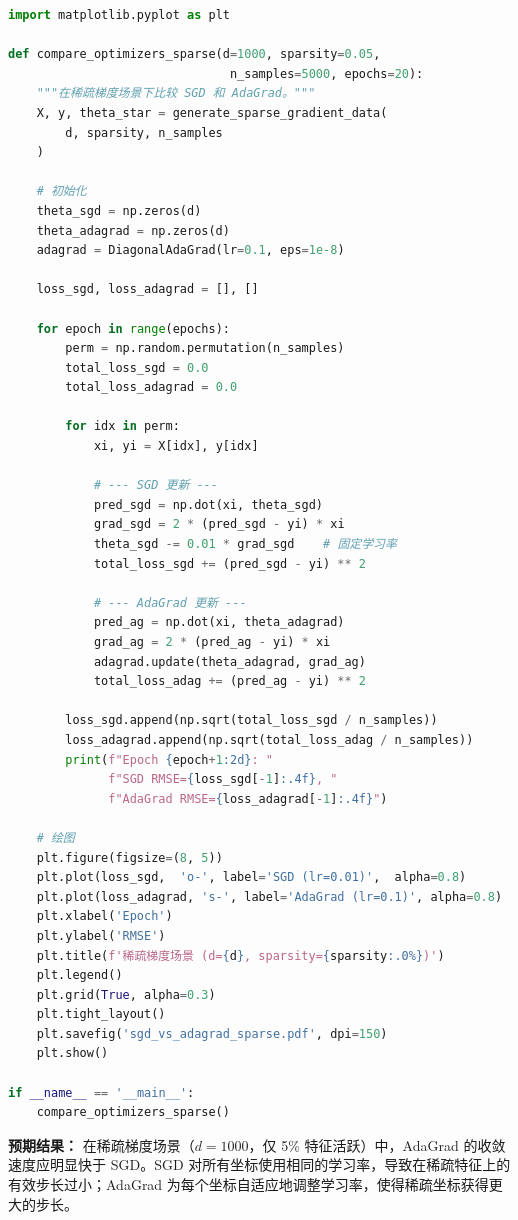 \documentclass[12pt,a4paper]{ctexart}
\theoremstyle{definition}
\theoremstyle{plain}
\theoremstyle{remark}
\begin{document}
\begin{lstlisting}[language=Python, caption={SGD vs AdaGrad 在稀疏场景的收敛比较}]
import matplotlib.pyplot as plt

def compare_optimizers_sparse(d=1000, sparsity=0.05,
                               n_samples=5000, epochs=20):
    """在稀疏梯度场景下比较 SGD 和 AdaGrad。"""
    X, y, theta_star = generate_sparse_gradient_data(
        d, sparsity, n_samples
    )

    # 初始化
    theta_sgd = np.zeros(d)
    theta_adagrad = np.zeros(d)
    adagrad = DiagonalAdaGrad(lr=0.1, eps=1e-8)

    loss_sgd, loss_adagrad = [], []

    for epoch in range(epochs):
        perm = np.random.permutation(n_samples)
        total_loss_sgd = 0.0
        total_loss_adagrad = 0.0

        for idx in perm:
            xi, yi = X[idx], y[idx]

            # --- SGD 更新 ---
            pred_sgd = np.dot(xi, theta_sgd)
            grad_sgd = 2 * (pred_sgd - yi) * xi
            theta_sgd -= 0.01 * grad_sgd    # 固定学习率
            total_loss_sgd += (pred_sgd - yi) ** 2

            # --- AdaGrad 更新 ---
            pred_ag = np.dot(xi, theta_adagrad)
            grad_ag = 2 * (pred_ag - yi) * xi
            adagrad.update(theta_adagrad, grad_ag)
            total_loss_adag += (pred_ag - yi) ** 2

        loss_sgd.append(np.sqrt(total_loss_sgd / n_samples))
        loss_adagrad.append(np.sqrt(total_loss_adag / n_samples))
        print(f"Epoch {epoch+1:2d}: "
              f"SGD RMSE={loss_sgd[-1]:.4f}, "
              f"AdaGrad RMSE={loss_adagrad[-1]:.4f}")

    # 绘图
    plt.figure(figsize=(8, 5))
    plt.plot(loss_sgd,  'o-', label='SGD (lr=0.01)',  alpha=0.8)
    plt.plot(loss_adagrad, 's-', label='AdaGrad (lr=0.1)', alpha=0.8)
    plt.xlabel('Epoch')
    plt.ylabel('RMSE')
    plt.title(f'稀疏梯度场景 (d={d}, sparsity={sparsity:.0%})')
    plt.legend()
    plt.grid(True, alpha=0.3)
    plt.tight_layout()
    plt.savefig('sgd_vs_adagrad_sparse.pdf', dpi=150)
    plt.show()

if __name__ == '__main__':
    compare_optimizers_sparse()
\end{lstlisting}

\textbf{预期结果：} 在稀疏梯度场景（$d = 1000$，仅 5\% 特征活跃）中，AdaGrad 的收敛速度应明显快于 SGD。SGD 对所有坐标使用相同的学习率，导致在稀疏特征上的有效步长过小；AdaGrad 为每个坐标自适应地调整学习率，使得稀疏坐标获得更大的步长。
\end{document}
